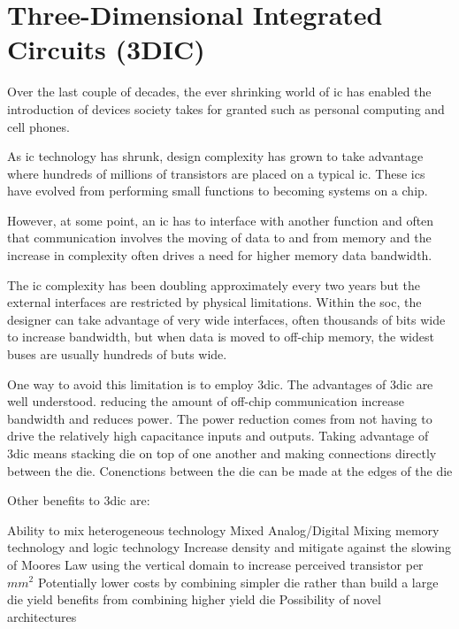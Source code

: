 

\chapter{Three-Dimensional Integrated Circuits (3DIC)}
\label{chap-three}

Over the last couple of decades, the ever shrinking world of \ac{ic} has enabled the introduction of devices society takes for granted such as personal computing and cell phones.

As \ac{ic} technology has shrunk, design complexity has grown to take advantage where hundreds of millions of transistors are placed on a typical \ac{ic}.
These \acp{ic} have evolved from performing small functions to becoming systems on a chip.

However, at some point, an \ac{ic} has to interface with another function and often that communication involves the moving of data to and from memory and the increase in complexity often drives a need for higher memory data bandwidth. 

The \ac{ic} complexity has been doubling approximately every two years but the external interfaces are restricted by physical limitations.
Within the \ac{soc}, the designer can take advantage of very wide interfaces, often thousands of bits wide to increase bandwidth, but when data is moved to off-chip memory, the widest buses are usually hundreds of buts wide.

One way to avoid this limitation is to employ \ac{3dic}. The advantages of \ac{3dic} are well understood. reducing the amount of off-chip communication increase bandwidth and reduces power. The power reduction comes from not having to drive the relatively
high capacitance inputs and outputs.
Taking advantage of \ac{3dic} means stacking die on top of one another and making connections directly between the die. Conenctions between the die can be made at the edges of the die

Other benefits to \ac{3dic} are:
\begin{outline}
  \1 Ability to mix heterogeneous technology
    \2 Mixed Analog/Digital
    \2 Mixing memory technology and logic technology
  \1 Increase density and mitigate against the slowing of Moores Law
    \2 using the vertical domain to increase perceived transistor per $mm^2$
  \1 Potentially lower costs by combining simpler die rather than build a large die
    \2 yield benefits from combining higher yield die
  \1 Possibility of novel architectures \cite{Kim2016}
\end{outline}

